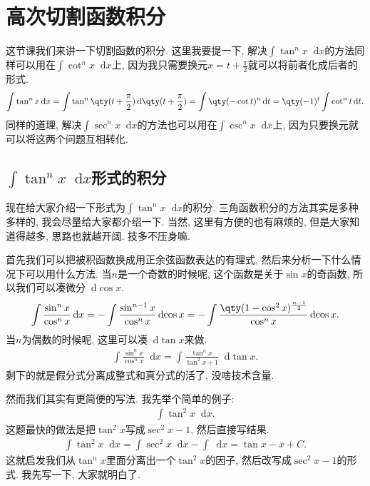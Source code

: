 \documentclass{ctexbook}
\newcommand*{\dif}{\mathop{}\!\mathrm{d}}
\begin{document}
{\section{高次切割函数积分}
这节课我们来讲一下切割函数的积分. 这里我要提一下, 解决$\int\tan^{n}{x}\dif{x}$的方法同样可以用在$\int\cot^{n}{x}\dif{x}$上, 因为我只需要换元$x=t+\frac{\pi}{2}$就可以将前者化成后者的形式. 
\begin{align*}
\int\tan^{n}{x}\dif{x}=\int\tan^{n}\qty(t+\frac{\pi}{2})\dif{\qty(t+\frac{\pi}{2})}=\int\qty(-\cot{t})^{n}\dif{t}=\qty(-1)^{t}\int\cot^{n}{t}\dif{t}
.\end{align*}
同样的道理, 解决$\int\sec^{n}{x}\dif{x}$的方法也可以用在$\int\csc^{n}{x}\dif{x}$上, 因为只要换元就可以将这两个问题互相转化. \par
\subsection{$\int\tan^{n}{x}\dif{x}$形式的积分}
现在给大家介绍一下形式为$\int\tan^{n}{x}\dif{x}$的积分. 三角函数积分的方法其实是多种多样的, 我会尽量给大家都介绍一下. 当然, 这里有方便的也有麻烦的, 但是大家知道得越多, 思路也就越开阔. 技多不压身嘛. \par
首先我们可以把被积函数换成用正余弦函数表达的有理式, 然后来分析一下什么情况下可以用什么方法. 当$n$是一个奇数的时候呢, 这个函数是关于$\sin{x}$的奇函数, 所以我们可以凑微分$\dif{\cos{x}}$. 
\begin{align*}
\int\frac{\sin^{n}{x}}{\cos^{n}{x}}\dif{x}=-\int\frac{\sin^{n-1}{x}}{\cos^{n}{x}}\dif{\cos{x}}=-\int\frac{\qty(1-\cos^{2}{x})^{\frac{n-1}{2}}}{\cos^{n}{x}}\dif{\cos{x}}
.\end{align*}
当$n$为偶数的时候呢, 这里可以凑$\dif{\tan{x}}$来做. 
\begin{align*}
\int\frac{\sin^{n}{x}}{\cos^{n}{x}}\dif{x}=\int\frac{\tan^{n}{x}}{\tan^{2}{x}+1}\dif{\tan{x}}
.\end{align*}
剩下的就是假分式分离成整式和真分式的活了, 没啥技术含量. \par
然而我们其实有更简便的写法. 我先举个简单的例子: 
\begin{align*}
\int\tan^{2}{x}\dif{x}
.\end{align*}
这题最快的做法是把$\tan^{2}{x}$写成$\sec^{2}{x}-1$, 然后直接写结果. 
\begin{align*}
\int\tan^{2}{x}\dif{x}=\int\sec^{2}{x}\dif{x}-\int\dif{x}=\tan{x}-x+C
.\end{align*}
这就启发我们从$\tan^{n}{x}$里面分离出一个$\tan^{2}{x}$的因子, 然后改写成$\sec^{2}{x}-1$的形式. 我先写一下, 大家就明白了. 
}
\end{document}
